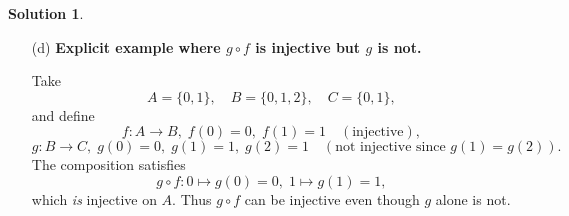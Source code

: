 \documentclass[12pt]{article}
\theoremstyle{definition} %
\newtheorem{solution}{Solution}
\theoremstyle{plain} %
\begin{document}
\begin{solution}
\begin{enumerate}
            \begin{proof}
                Let \(y_1,y_2\in B\) with \(g(y_1)=g(y_2)\).
                Because \(f\) is onto, pick \(x_1,x_2\in A\) such that
                \(f(x_1)=y_1\) and \(f(x_2)=y_2\).
                Then
                \[
                     (g\circ f)(x_1)=g\!\bigl(f(x_1)\bigr)=g(y_1)=g(y_2)
                     =g\!\bigl(f(x_2)\bigr)=(g\circ f)(x_2).
                \]
                Injectivity of \(g\circ f\) yields \(x_1=x_2\).
                Applying \(f\) to both sides gives \(y_1=y_2\).
                Hence \(g\) is injective.
            \end{proof}
  
      \item[(d)] \textbf{Explicit example where \(g\circ f\) is injective but \(g\) is not.}
  
            Take
            \[
                A=\{0,1\},\quad
                B=\{0,1,2\},\quad
                C=\{0,1\},
            \]
            and define
            \[
                f:A\to B,\;
                f(0)=0,\;f(1)=1
                \quad(\text{injective}),
            \]
            \[
                g:B\to C,\;
                g(0)=0,\;g(1)=1,\;g(2)=1
                \quad(\text{not injective since }g(1)=g(2)).
            \]
            The composition satisfies
            \[
                g\circ f :
                0\mapsto g(0)=0,\;
                1\mapsto g(1)=1,
            \]
            which \emph{is} injective on \(A\).
            Thus \(g\circ f\) can be injective even though \(g\) alone is not.
  \end{enumerate}
  \end{solution}
\end{document}
